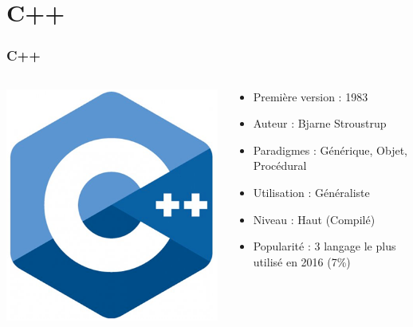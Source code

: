 \documentclass{beamer}
\begin{document}
	\section{C++}
	\begin{frame}
	\frametitle{C++}
	\begin{columns}

	\begin{column}{3cm}
				\includegraphics[scale=0.26]{Langagec++.png}
	\end{column}

	\begin{column}{7cm}
		\begin{itemize}
			\item Première version : 1983
			\item Auteur : Bjarne Stroustrup
			\item Paradigmes : Générique, Objet, Procédural
			\item Utilisation : Généraliste
			\item Niveau : Haut (Compilé)
			\item Popularité : 3 langage le plus utilisé en 2016 (7\%)
		\end{itemize}
	\end{column}
	\end{columns}

	\end{frame}
	
\end{document}
